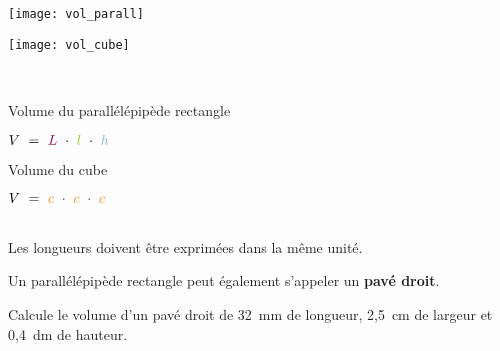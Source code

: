  \begin{aconnaitre}
   \begin{minipage}[t]{0.48\linewidth}
  \begin{center} \texttt{[image: vol\_parall]} \end{center}
  \end{minipage} \hfill%
   \begin{minipage}[t]{0.48\linewidth}    
  \begin{center}  \texttt{[image: vol\_cube]} \end{center}
   \end{minipage} \\
   \begin{minipage}[t]{0.48\linewidth}
  \begin{center} Volume du parallélépipède rectangle \end{center}
  \begin{center} $V = \textcolor{C1}{L} \cdot \textcolor{H1}{l} \cdot \textcolor{U1}{h}$ \end{center}
  \end{minipage} \hfill%
   \begin{minipage}[t]{0.48\linewidth}  
  \begin{center} Volume du cube \end{center}
  \begin{center} $V = \textcolor{J1}{c} \cdot \textcolor{J1}{c} \cdot  \textcolor{J1}{c}$ \end{center}
   \end{minipage} \\[1em]
Les longueurs doivent être exprimées dans la même unité.
\end{aconnaitre}

\begin{methode*1}

 \begin{remarque}
Un parallélépipède rectangle peut également s'appeler un \textbf{pavé droit}.
 \end{remarque}
 
 \begin{exemple*1}
Calcule le volume d'un pavé droit de 32 mm de longueur, 2,5 cm de largeur et 0,4 dm de hauteur. \\[1em]
 \end{exemple*1}


 \exercice  


 \end{methode*1}
 
